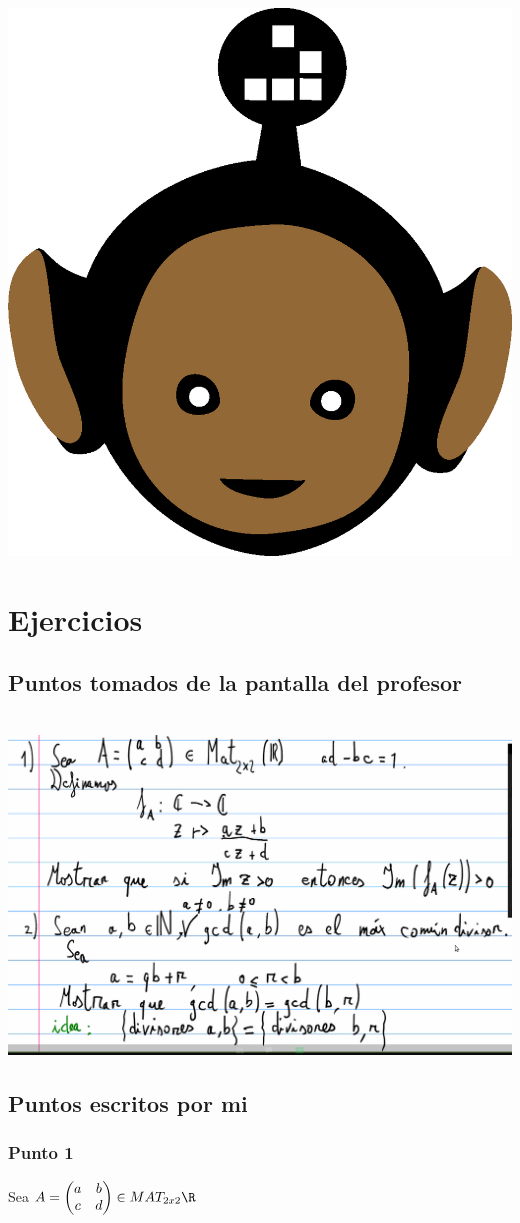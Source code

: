 \documentclass[10pt,a4paper]{article} %
\begin{document}
    \title{\rmfamily\normalfont{}}
    \author{}
    \date{\today} 
    
    \maketitle
     

    \includegraphics[width=0.1\linewidth]{negro_cara.png}
    \section{Ejercicios}
        \subsection{Puntos tomados de la pantalla del profesor  }
            \\ \includegraphics[width=0.8\linewidth]{ejercicios.png}
        \subsection{Puntos escritos por mi}
            \subsubsection{Punto 1}
                Sea $ A = \begin{pmatrix}
                    a & b 
                    \\ c & d
                \end{pmatrix}
                \in  MAT_{2x2} \R  $ 
\end{document}
